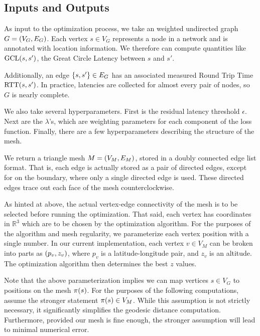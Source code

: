 \subsection{Inputs and Outputs}
As input to the optimization process, we take an weighted undirected graph \(G = \pof{V_G, E_G}\). Each vertex \(s \in V_G\) represents a node in a network and is annotated with location information. We therefore can compute quantities like \(\GCL\pof{s, s'}\), the Great Circle Latency between \(s\) and \(s'\).

Additionally, an edge \(\cof{s, s'} \in E_G\) has an associated measured Round Trip Time \(\RTT\pof{s, s'}\). In practice, latencies are collected for almost every pair of nodes, so \(G\) is nearly complete.

We also take several hyperparameters. First is the residual latency threshold \(\epsilon\). Next are the \(\lambda\)'s, which are weighting parameters for each component of the loss function. Finally, there are a few hyperparameters describing the structure of the mesh.

We return a triangle mesh \(M = \pof{V_M, E_M}\), stored in a doubly connected edge list format. That is, each edge is actually stored as a pair of directed edges, except for on the boundary, where only a single directed edge is used. These directed edges trace out each face of the mesh counterclockwise.

As hinted at above, the actual vertex-edge connectivity of the mesh is to be selected before running the optimization. That said, each vertex has coordinates in \(\mathbb{R}^3\) which are to be chosen by the optimization algorithm. For the purposes of the algorithm and mesh regularity, we parameterize each vertex position with a single number. In our current implementation, each vertex \(v \in V_M\) can be broken into parts as \(\pof{p_v, z_v}\), where \(p_v\) is a latitude-longitude pair, and \(z_v\) is an altitude. The optimization algorithm then determines the best \(z\) values.

Note that the above parameterization implies we can map vertices \(s \in V_G\) to positions on the mesh \(\pi\pof{s}\). For the purposes of the following computations, assume the stronger statement \(\pi\pof{s} \in V_M\). While this assumption is not strictly necessary, it significantly simplifies the geodesic distance computation. Furthermore, provided our mesh is fine enough, the stronger assumption will lead to minimal numerical error.
